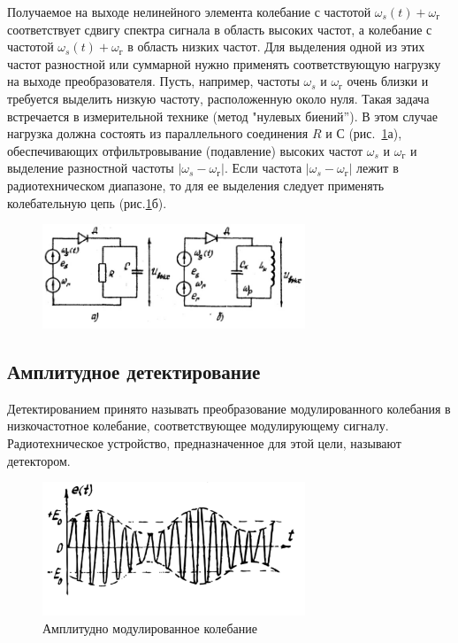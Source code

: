 Получаемое на выходе нелинейного элемента колебание с частотой $\omega_s(t)+\omega_{\text{г}}$ соответствует сдвигу спектра сигнала в область высоких частот, а колебание с частотой $\omega_s(t)+\omega_{\text{г}}$ в область низких частот. Для выделения одной из этих частот разностной или суммарной нужно применять соответствующую нагрузку на выходе преобразователя. Пусть, например, частоты $\omega_s$ и $\omega_{\text{г}}$ очень близки и требуется выделить низкую частоту, расположенную около нуля. Такая задача встречается в измерительной технике (метод "нулевых биений”). В этом случае нагрузка должна состоять из параллельного соединения $R$ и $С$ (рис.~\ref{pic:7}а), обеспечивающих отфильтровывание (подавление) высоких частот $\omega_s$ и $\omega_{\text{г}}$ и выделение разностной частоты $|\omega_s - \omega_{\text{г}}|$. Если частота	$|\omega_s - \omega_{\text{г}}|$ лежит в радиотехническом диапазоне, то для ее выделения следует применять колебательную цепь (рис.\ref{pic:7}б).
\begin{figure}[h!]
	\centering
	\includegraphics[width=0.7\textwidth]{picture/pic7.jpg}
	\caption{}
	\label{pic:7}
\end{figure}
\subsection{Амплитудное детектирование}
Детектированием принято называть преобразование модулированного колебания в
низкочастотное колебание, соответствующее модулирующему сигналу. Радиотехническое устройство, предназначенное для этой цели, называют детектором.

\begin{figure}[h!]
	\centering
	\includegraphics[width=0.7\textwidth]{picture/pic8.jpg}
	\caption{Амплитудно модулированное колебание}
	\label{pic:8}
\end{figure}

